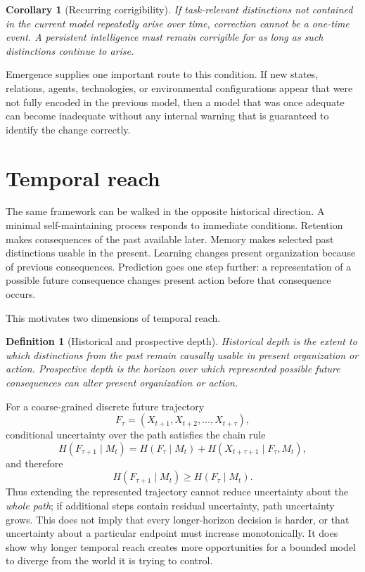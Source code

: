 \documentclass[11pt,a4paper]{article}
\newtheorem{corollary}{Corollary}
\newtheorem{definition}{Definition}
\begin{document}
\begin{corollary}[Recurring corrigibility]
If task-relevant distinctions not contained in the current model repeatedly arise over time, correction cannot be a one-time event. A persistent intelligence must remain corrigible for as long as such distinctions continue to arise.
\end{corollary}

Emergence supplies one important route to this condition. If new states, relations, agents, technologies, or environmental configurations appear that were not fully encoded in the previous model, then a model that was once adequate can become inadequate without any internal warning that is guaranteed to identify the change correctly.

\section{Temporal reach}

The same framework can be walked in the opposite historical direction. A minimal self-maintaining process responds to immediate conditions. Retention makes consequences of the past available later. Memory makes selected past distinctions usable in the present. Learning changes present organization because of previous consequences. Prediction goes one step further: a representation of a possible future consequence changes present action before that consequence occurs.

This motivates two dimensions of temporal reach.

\begin{definition}[Historical and prospective depth]
\emph{Historical depth} is the extent to which distinctions from the past remain causally usable in present organization or action. \emph{Prospective depth} is the horizon over which represented possible future consequences can alter present organization or action.
\end{definition}

For a coarse-grained discrete future trajectory
\[
F_{\tau} = (X_{t+1},X_{t+2},\ldots,X_{t+\tau}),
\]
conditional uncertainty over the path satisfies the chain rule
\[
H(F_{\tau+1}\mid M_t)
=
H(F_{\tau}\mid M_t)
+
H(X_{t+\tau+1}\mid F_{\tau},M_t),
\]
and therefore
\[
H(F_{\tau+1}\mid M_t) \geq H(F_{\tau}\mid M_t).
\]
Thus extending the represented trajectory cannot reduce uncertainty about the \emph{whole path}; if additional steps contain residual uncertainty, path uncertainty grows. This does not imply that every longer-horizon decision is harder, or that uncertainty about a particular endpoint must increase monotonically. It does show why longer temporal reach creates more opportunities for a bounded model to diverge from the world it is trying to control.
\end{document}
